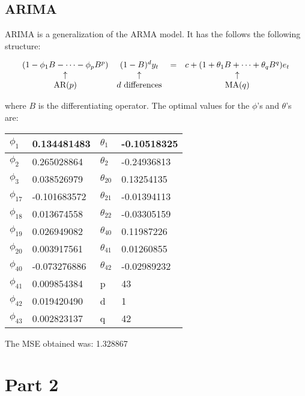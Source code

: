 
\subsection{ARIMA}

ARIMA is a generalization of the ARMA model. It has the follows the following structure:

$$
\begin{array}{c c c c}
(1-\phi_1B - \cdots - \phi_p B^p) & (1-B)^d y_{t} &= &c + (1 + \theta_1 B + \cdots + \theta_q B^q)e_t\\
\uparrow & \uparrow & &\uparrow\\
\text{AR($p$)} & \text{$d$ differences} & &\text{MA($q$)}\\
\end{array}
$$

where $B$ is the differentiating operator.
The optimal values for the $\phi$'s and $\theta$'s are:
\begin{center}
	\begin{tabular}{| l | l|| l | l|}
		\hline
$\phi_{1} $ &0.134481483 	&$\theta_{1 }$	& -0.10518325		\\\hline
$\phi_{2 }$ &0.265028864 	&$\theta_{2}$ 	&-0.24936813		\\\hline
$\phi_{3} $ &0.038526979	&$\theta_{20}$ 	&0.13254135		\\\hline
$\phi_{17}$ &-0.101683572	&$\theta_{21}$ 	&-0.01394113		\\\hline
$\phi_{18}$ &0.013674558	&$\theta_{22}$ 	&-0.03305159		\\\hline
$\phi_{19}$ &0.026949082 	&$\theta_{40}$ 	&0.11987226 		\\\hline
$\phi_{20}$ &0.003917561	&$\theta_{41}$ 	&0.01260855		\\\hline
$\phi_{40}$ &-0.073276886	&$\theta_{42}$ 	&-0.02989232		\\\hline
$\phi_{41}$ & 0.009854384	& p     &	43	\\\hline
$\phi_{42}$ &0.019420490 	&d  	&	1	\\\hline
$\phi_{43}$ &0.002823137	& q	&	42	\\\hline
	\end{tabular}
\end{center}

The MSE obtained was:
1.328867

\section{Part 2}

